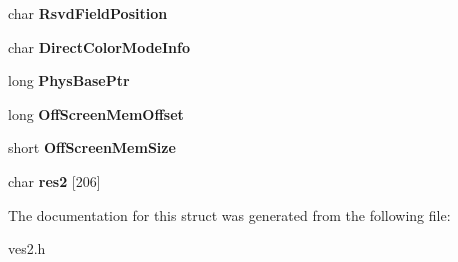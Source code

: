 \begin{DoxyCompactItemize}
\item 
char {\bfseries Rsvd\-Field\-Position}\label{structVBE__modeInfo_a7c8b588547da14f8befa3b2cd645f4ba}

\item 
char {\bfseries Direct\-Color\-Mode\-Info}\label{structVBE__modeInfo_a20a9bf8fa2a9a4d74577e17bd92d9c7c}

\item 
long {\bfseries Phys\-Base\-Ptr}\label{structVBE__modeInfo_aa1b2a742685c7c23c19537e751d32f60}

\item 
long {\bfseries Off\-Screen\-Mem\-Offset}\label{structVBE__modeInfo_af635400d91f458fbf8e539468af06528}

\item 
short {\bfseries Off\-Screen\-Mem\-Size}\label{structVBE__modeInfo_a97f8613ccd5132aaf4a22952bb740745}

\item 
char {\bfseries res2} [206]\label{structVBE__modeInfo_aee93cd265d2bc83d6b9334e40fc15223}

\end{DoxyCompactItemize}


The documentation for this struct was generated from the following file\-:\begin{DoxyCompactItemize}
\item 
ves2.\-h\end{DoxyCompactItemize}
